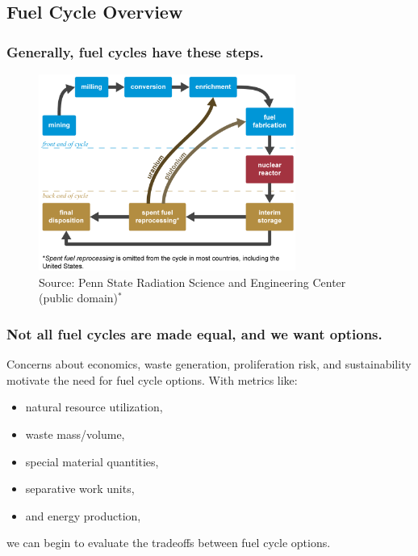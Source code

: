 \documentclass[9pt]{beamer}
\begin{document}
\subsection{Fuel Cycle Overview}
  \begin{frame}
      \frametitle{Generally, fuel cycles have these steps.}
      \begin{figure}[ht!]
      \centering
      \includegraphics[width=0.75\textwidth]{images/nuclear_fuel_cycle.png}
      \caption{Source: Penn State Radiation Science and Engineering Center (public domain)$^{*}$}
      \end{figure}
  \end{frame}

  \begin{frame}
      \frametitle{Not all fuel cycles are made equal, and we want options.}
      Concerns about economics, waste generation, proliferation risk, and sustainability motivate the need for fuel cycle options. With metrics like:
        \begin{itemize}%
            \item natural resource utilization, %
            \item waste mass/volume,
            \item special material quantities,
            \item separative work units,
            \item and energy production,
        \end{itemize}
        we can begin to evaluate the tradeoffs between fuel cycle options.
  \end{frame}
\end{document}
